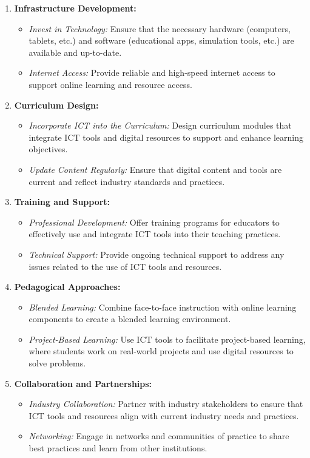 \documentclass[10pt]{article}
\begin{document}
\begin{enumerate}
    \item \textbf{Infrastructure Development:}
    \begin{itemize}
        \item \textit{Invest in Technology:} Ensure that the necessary hardware (computers, tablets, etc.) and software (educational apps, simulation tools, etc.) are available and up-to-date.
        \item \textit{Internet Access:} Provide reliable and high-speed internet access to support online learning and resource access.
    \end{itemize}
    \item \textbf{Curriculum Design:}
    \begin{itemize}
        \item \textit{Incorporate ICT into the Curriculum:} Design curriculum modules that integrate ICT tools and digital resources to support and enhance learning objectives.
        \item \textit{Update Content Regularly:} Ensure that digital content and tools are current and reflect industry standards and practices.
    \end{itemize}
    \item \textbf{Training and Support:}
    \begin{itemize}
        \item \textit{Professional Development:} Offer training programs for educators to effectively use and integrate ICT tools into their teaching practices.
        \item \textit{Technical Support:} Provide ongoing technical support to address any issues related to the use of ICT tools and resources.
    \end{itemize}
    \item \textbf{Pedagogical Approaches:}
    \begin{itemize}
        \item \textit{Blended Learning:} Combine face-to-face instruction with online learning components to create a blended learning environment.
        \item \textit{Project-Based Learning:} Use ICT tools to facilitate project-based learning, where students work on real-world projects and use digital resources to solve problems.
    \end{itemize}
    \item \textbf{Collaboration and Partnerships:}
    \begin{itemize}
        \item \textit{Industry Collaboration:} Partner with industry stakeholders to ensure that ICT tools and resources align with current industry needs and practices.
        \item \textit{Networking:} Engage in networks and communities of practice to share best practices and learn from other institutions.
    \end{itemize}
\end{enumerate}
\end{document}

